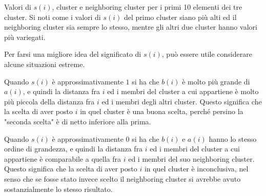 \documentclass[a4paper, 12pt]{report}
\begin{document}
			\begin{table}
				\centering
				\begin{minipage}{0.25\linewidth}
				\end{minipage}
				\begin{minipage}{0.25\linewidth}
				\end{minipage}
				\begin{minipage}{0.25\linewidth}
				\end{minipage}
				\caption{Valori di $s(i)$, cluster e neighboring cluster per
				i primi 10 elementi dei tre cluster. Si noti come i valori
				di $s(i)$ del primo cluster siano più alti ed il neighboring
				cluster sia sempre lo stesso, mentre gli altri due cluster
				hanno valori più variegati.}
				\label{tab:iris}
			\end{table}

			Per farsi una migliore idea del significato di $s(i)$, può essere
			utile considerare alcune situazioni estreme.

			Quando $s(i)$ è approssimativamente $1$ si ha che $b(i)$ è molto
			più grande di $a(i)$, e quindi la distanza fra $i$ ed i membri del
			cluster a cui appartiene è molto più piccola della distanza fra $i$
			ed i membri degli altri cluster. Questo significa che la scelta di
			aver posto $i$ in quel cluster è una buona scelta, perché persino
			la "seconda scelta" è di netto inferiore alla prima.

			Quando $s(i)$ è approssimativamente $0$ si ha che $b(i)$ e $a(i)$
			hanno lo stesso ordine di grandezza, e quindi la distanza fra $i$
			ed i membri del cluster a cui appartiene è comparabile a quella
			fra $i$ ed i membri del suo neighboring cluster. Questo significa
			che la scelta di aver posto $i$ in quel cluster è inconclusiva,
			nel senso che se fosse stato invece scelto il neighboring cluster
			si avrebbe avuto sostanzialmente lo stesso risultato.
\end{document}
